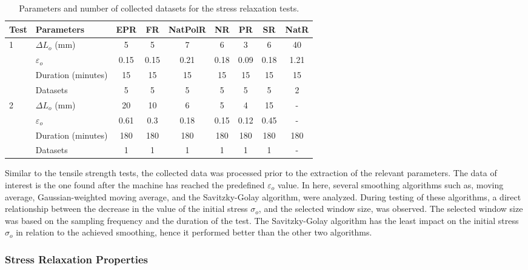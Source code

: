 \begin{table*}[htbp!]
\centering
\caption{Parameters and number of collected datasets for the stress relaxation tests.}
\label{tbl:stressRelParameters}
\begin{tabular}{llccccccc} \toprule
Test & Parameters & EPR & FR & NatPolR & NR & PR & SR & NatR \\
\hline
\multirow{4}{*}{1}  & $\Delta L_o$ (mm)      & 5 & 5 & 7 & 6 & 3 & 6 & 40 \\
                    & $\varepsilon_o$	   & 0.15 & 0.15 & 0.21 & 0.18 & 0.09 & 0.18 & 1.21 \\
                    & Duration (minutes)    & 15 & 15 & 15 & 15 & 15 & 15 & 15 \\
                    & Datasets              & 5 & 5 & 5 & 5 & 5 & 5 & 2 \\
\hline 
\multirow{4}{*}{2}  & $\Delta L_o$ (mm)      & 20 & 10 & 6 & 5 & 4 & 15 & - \\
                    & $\varepsilon_o$	   & 0.61 & 0.3 & 0.18 & 0.15 & 0.12 & 0.45 & - \\
                    & Duration (minutes)    & 180 & 180 & 180 & 180 & 180 & 180 & 180 \\
                    & Datasets              & 1 & 1 & 1 & 1 & 1 & 1 & - \\
\bottomrule
\end{tabular}
\end{table*}

Similar to the tensile strength tests, the collected data was processed prior to the extraction of the relevant parameters. The data of interest is the one found after the machine has reached the predefined $\varepsilon_o$ value. In here, several smoothing algorithms such as, moving average, Gaussian-weighted moving average, and the Savitzky-Golay algorithm, were analyzed. During testing of these algorithms, a direct relationship between the decrease in the value of the initial stress $\sigma_o$, and the selected window size, was observed. The selected window size was based on the sampling frequency and the duration of the test. The Savitzky-Golay algorithm has the least impact on the initial stress $\sigma_o$ in relation to the achieved smoothing, hence it performed better than the other two algorithms.

\subsubsection{Stress Relaxation Properties}


